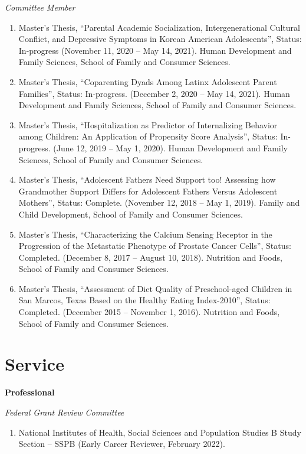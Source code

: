\documentclass[
]{article}
\providecommand{\tightlist}{%
  \setlength{\itemsep}{0pt}\setlength{\parskip}{0pt}}
\begin{document}
\emph{Committee Member}

\begin{enumerate}
\def\labelenumi{\arabic{enumi}.}
\item
  Master's Thesis, ``Parental Academic Socialization, Intergenerational
  Cultural Conflict, and Depressive Symptoms in Korean American
  Adolescents'', Status: In-progress (November 11, 2020 -- May 14,
  2021). Human Development and Family Sciences, School of Family and
  Consumer Sciences.
\item
  Master's Thesis, ``Coparenting Dyads Among Latinx Adolescent Parent
  Families'', Status: In-progress. (December 2, 2020 -- May 14, 2021).
  Human Development and Family Sciences, School of Family and Consumer
  Sciences.
\item
  Master's Thesis, ``Hospitalization as Predictor of Internalizing
  Behavior among Children: An Application of Propensity Score
  Analysis'', Status: In-progress. (June 12, 2019 -- May 1, 2020). Human
  Development and Family Sciences, School of Family and Consumer
  Sciences.
\item
  Master's Thesis, ``Adolescent Fathers Need Support too! Assessing how
  Grandmother Support Differs for Adolescent Fathers Versus Adolescent
  Mothers'', Status: Complete. (November 12, 2018 -- May 1, 2019).
  Family and Child Development, School of Family and Consumer Sciences.
\item
  Master's Thesis, ``Characterizing the Calcium Sensing Receptor in the
  Progression of the Metastatic Phenotype of Prostate Cancer Cells'',
  Status: Completed. (December 8, 2017 -- August 10, 2018). Nutrition
  and Foods, School of Family and Consumer Sciences.
\item
  Master's Thesis, ``Assessment of Diet Quality of Preschool-aged
  Children in San Marcos, Texas Based on the Healthy Eating
  Index-2010'', Status: Completed. (December 2015 -- November 1, 2016).
  Nutrition and Foods, School of Family and Consumer Sciences.
\end{enumerate}

\hypertarget{service}{%
\section{\texorpdfstring{\textbf{Service}}{Service}}\label{service}}

\textbf{Professional}

\emph{Federal Grant Review Committee}

\begin{enumerate}
\def\labelenumi{\arabic{enumi}.}
\tightlist
\item
  National Institutes of Health, Social Sciences and Population Studies
  B Study Section -- SSPB (Early Career Reviewer, February 2022).
\end{enumerate}
\end{document}
